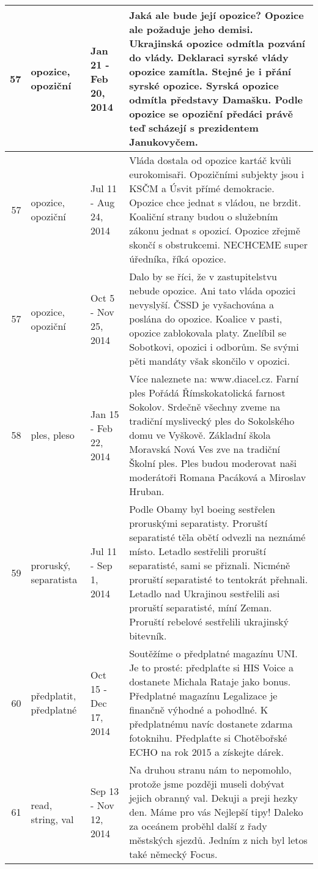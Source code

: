 \begin{tabularx}{\linewidth}{r m{2.5cm} X m{8cm}}
57 & opozice, opoziční & Jan 21 - Feb 20, 2014 & Jaká ale bude její opozice? Opozice ale požaduje jeho demisi. Ukrajinská opozice odmítla pozvání do vlády. Deklaraci syrské vlády opozice zamítla. Stejné je i přání syrské opozice. Syrská opozice odmítla představy Damašku. Podle opozice se opoziční předáci právě teď scházejí s prezidentem Janukovyčem. \\ \midrule
57 & opozice, opoziční & Jul 11 - Aug 24, 2014 & Vláda dostala od opozice kartáč kvůli eurokomisaři. Opozičními subjekty jsou i KSČM a Úsvit přímé demokracie. Opozice chce jednat s vládou, ne brzdit. Koaliční strany budou o služebním zákonu jednat s opozicí. Opozice zřejmě skončí s obstrukcemi. NECHCEME super úředníka, říká opozice. \\ \midrule
57 & opozice, opoziční & Oct 5 - Nov 25, 2014 & Dalo by se říci, že v zastupitelstvu nebude opozice. Ani tato vláda opozici nevyslyší. ČSSD je vyšachována a poslána do opozice. Koalice v pasti, opozice zablokovala platy. Znelíbil se Sobotkovi, opozici i odborům. Se svými pěti mandáty však skončilo v opozici. \\ \midrule
58 & ples, pleso & Jan 15 - Feb 22, 2014 & Více naleznete na: www.diacel.cz. Farní ples Pořádá Římskokatolická farnost Sokolov. Srdečně všechny zveme na tradiční myslivecký ples do Sokolského domu ve Vyškově. Základní škola Moravská Nová Ves zve na tradiční Školní ples. Ples budou moderovat naši moderátoři Romana Pacáková a Miroslav Hruban. \\ \midrule
59 & proruský, separatista & Jul 11 - Sep 1, 2014 & Podle Obamy byl boeing sestřelen proruskými separatisty. Proruští separatisté těla obětí odvezli na neznámé místo. Letadlo sestřelili proruští separatisté, sami se přiznali. Nicméně proruští separatisté to tentokrát přehnali. Letadlo nad Ukrajinou sestřelili asi proruští separatisté, míní Zeman. Proruští rebelové sestřelili ukrajinský bitevník. \\ \midrule
60 & předplatit, předplatné & Oct 15 - Dec 17, 2014 & Soutěžíme o předplatné magazínu UNI. Je to prosté: předplaťte si HIS Voice a dostanete Michala Rataje jako bonus. Předplatné magazínu Legalizace je finančně výhodné a pohodlné. K předplatnému navíc dostanete zdarma fotoknihu. Předplaťte si Chotěbořské ECHO na rok 2015 a získejte dárek. \\ \midrule
61 & read, string, val & Sep 13 - Nov 12, 2014 & Na druhou stranu nám to nepomohlo, protože jsme později museli dobývat jejich obranný val. Dekuji a preji hezky den. Máme pro vás Nejlepší tipy! Daleko za oceánem proběhl další z řady městských sjezdů. Jedním z nich byl letos také německý Focus. \\ \midrule

\end{tabularx}
